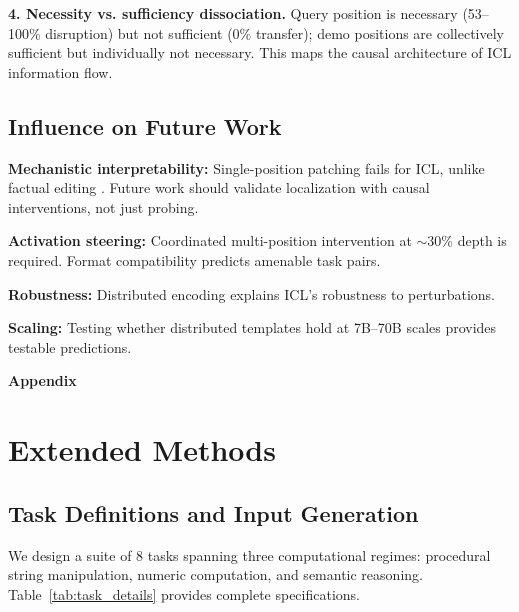\documentclass{article}
\begin{document}
\textbf{4. Necessity vs. sufficiency dissociation.} Query position is necessary (53--100\% disruption) but not sufficient (0\% transfer); demo positions are collectively sufficient but individually not necessary. This maps the causal architecture of ICL information flow.

\subsection*{Influence on Future Work}

\textbf{Mechanistic interpretability:} Single-position patching fails for ICL, unlike factual editing \citep{meng2022locating}. Future work should validate localization with causal interventions, not just probing.

\textbf{Activation steering:} Coordinated multi-position intervention at $\sim$30\% depth is required. Format compatibility predicts amenable task pairs.

\textbf{Robustness:} Distributed encoding explains ICL's robustness to perturbations.

\textbf{Scaling:} Testing whether distributed templates hold at 7B--70B scales provides testable predictions.

\newpage
\appendix
\begin{center}
\Large\textbf{Appendix}
\end{center}
\vspace{1em}

\section{Extended Methods}
\label{app:methods}

\subsection{Task Definitions and Input Generation}

We design a suite of 8 tasks spanning three computational regimes: procedural string manipulation, numeric computation, and semantic reasoning. Table~\ref{tab:task_details} provides complete specifications.
\end{document}
